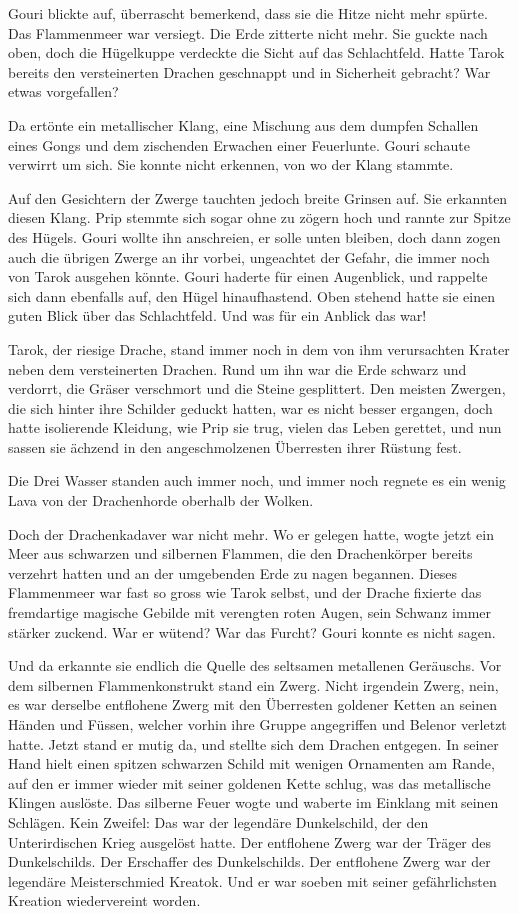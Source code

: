 Gouri blickte auf, überrascht bemerkend, dass sie die Hitze nicht mehr spürte. Das Flammenmeer war versiegt. Die Erde zitterte nicht mehr. Sie guckte nach oben, doch die Hügelkuppe verdeckte die Sicht auf das Schlachtfeld. Hatte Tarok bereits den versteinerten Drachen geschnappt und in Sicherheit gebracht? War etwas vorgefallen?

Da ertönte ein metallischer Klang, eine Mischung aus dem dumpfen Schallen eines Gongs und dem zischenden Erwachen einer Feuerlunte. Gouri schaute verwirrt um sich. Sie konnte nicht erkennen, von wo der Klang stammte.

Auf den Gesichtern der Zwerge tauchten jedoch breite Grinsen auf. Sie erkannten diesen Klang. Prip stemmte sich sogar ohne zu zögern hoch und rannte zur Spitze des Hügels. Gouri wollte ihn anschreien, er solle unten bleiben, doch dann zogen auch die übrigen Zwerge an ihr vorbei, ungeachtet der Gefahr, die immer noch von Tarok ausgehen könnte. Gouri haderte für einen Augenblick, und rappelte sich dann ebenfalls auf, den Hügel hinaufhastend. Oben stehend hatte sie einen guten Blick über das Schlachtfeld. Und was für ein Anblick das war!

Tarok, der riesige Drache, stand immer noch in dem von ihm verursachten Krater neben dem versteinerten Drachen. Rund um ihn war die Erde schwarz und verdorrt, die Gräser verschmort und die Steine gesplittert. Den meisten Zwergen, die sich hinter ihre Schilder geduckt hatten, war es nicht besser ergangen, doch hatte isolierende Kleidung, wie Prip sie trug, vielen das Leben gerettet, und nun sassen sie ächzend in den angeschmolzenen Überresten ihrer Rüstung fest.

Die Drei Wasser standen auch immer noch, und immer noch regnete es ein wenig Lava von der Drachenhorde oberhalb der Wolken.

Doch der Drachenkadaver war nicht mehr. Wo er gelegen hatte, wogte jetzt ein Meer aus schwarzen und silbernen Flammen, die den Drachenkörper bereits verzehrt hatten und an der umgebenden Erde zu nagen begannen. Dieses Flammenmeer war fast so gross wie Tarok selbst, und der Drache fixierte das fremdartige magische Gebilde mit verengten roten Augen, sein Schwanz immer stärker zuckend. War er wütend? War das Furcht? Gouri konnte es nicht sagen.

Und da erkannte sie endlich die Quelle des seltsamen metallenen Geräuschs. Vor dem silbernen Flammenkonstrukt stand ein Zwerg. Nicht irgendein Zwerg, nein, es war derselbe entflohene Zwerg mit den Überresten goldener Ketten an seinen Händen und Füssen, welcher vorhin ihre Gruppe angegriffen und Belenor verletzt hatte. Jetzt stand er mutig da, und stellte sich dem Drachen entgegen. In seiner Hand hielt einen spitzen schwarzen Schild mit wenigen Ornamenten am Rande, auf den er immer wieder mit seiner goldenen Kette schlug, was das metallische Klingen auslöste. Das silberne Feuer wogte und waberte im Einklang mit seinen Schlägen. Kein Zweifel: Das war der legendäre Dunkelschild, der den Unterirdischen Krieg ausgelöst hatte. Der entflohene Zwerg war der Träger des Dunkelschilds. Der Erschaffer des Dunkelschilds. Der entflohene Zwerg war der legendäre Meisterschmied Kreatok. Und er war soeben mit seiner gefährlichsten Kreation wiedervereint worden.

